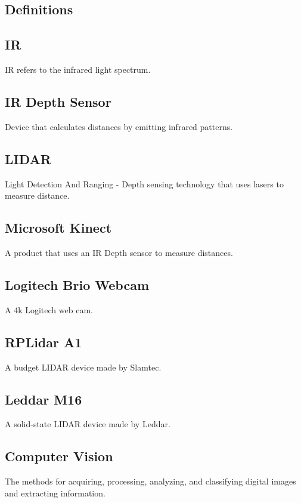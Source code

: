 \documentclass[onecolumn, draftclsnofoot,10pt, compsoc]{IEEEtran}
\begin{document}
\begin{singlespace}
	\section{Definitions}
		\subsection{IR}\label{def:IR}
		IR refers to the infrared light spectrum.

		\subsection{IR Depth Sensor}\label{def:depthsensor}
		Device that calculates distances by emitting infrared patterns. 
		
		\subsection{LIDAR}\label{def:lidar}
		Light Detection And Ranging - Depth sensing technology that uses lasers to measure distance.
		
		\subsection{Microsoft Kinect}\label{def:kinect}
		A product that uses an IR Depth sensor to measure distances.
		
		\subsection{Logitech Brio Webcam}\label{def:brio}
		A 4k Logitech web cam. \cite{logitech}
		
		\subsection{RPLidar A1}\label{def:rplidar}
		A budget LIDAR device made by Slamtec. \cite{slamtec}

		\subsection{Leddar M16}\label{def:m16}
		A solid-state LIDAR device made by Leddar. \cite{leddartech}

		\subsection{Computer Vision }\label{def:vision}
		The methods for acquiring, processing, analyzing, and classifying digital images and extracting information.


\end{singlespace}
\end{document}

